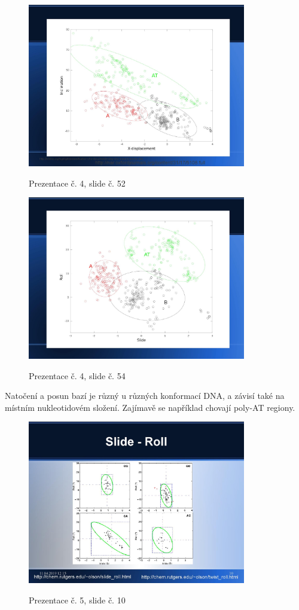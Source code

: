 \documentclass[DIV=8]{scrreprt}
\begin{document}
\begin{figure}
    \caption{Prezentace č. 4, slide č. 52}
    \includegraphics[width=0.85\textwidth]{slides-4/slide-52.jpg}
    \centering
    \label{slides-4-slide-52}
\end{figure}
\begin{figure}
    \caption{Prezentace č. 4, slide č. 54}
    \includegraphics[width=0.85\textwidth]{slides-4/slide-54.jpg}
    \centering
    \label{slides-4-slide-54}
\end{figure}
 Natočení a posun bazí je různý u různých konformací DNA, a závisí také na místním nukleotidovém složení. Zajímavě se například chovají poly-AT regiony. \begin{figure}
    \caption{Prezentace č. 5, slide č. 10}
    \includegraphics[width=0.85\textwidth]{slides-5/slide-10.jpg}
    \centering
    \label{slides-5-slide-10}
\end{figure}
\end{document}
